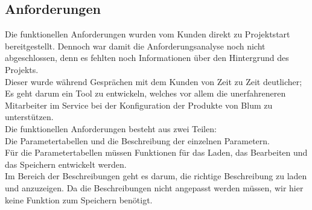 \documentclass[a4paper,12pt,top=2.5cm,bottom=2.5cm, left=2.5cm, right=2.5cm, numbers=noenddot]{scrartcl}
\begin{document}
\subsection{Anforderungen}
Die funktionellen Anforderungen wurden vom Kunden direkt zu Projektstart bereitgestellt. Dennoch war damit die Anforderungsanalyse noch nicht abgeschlossen, denn es fehlten noch Informationen über den Hintergrund des Projekts. \\
Dieser wurde während Gesprächen mit dem Kunden von Zeit zu Zeit deutlicher; Es geht darum ein Tool zu entwickeln, welches vor allem die unerfahreneren Mitarbeiter im Service bei der Konfiguration der Produkte von Blum zu unterstützen.\\
Die funktionellen Anforderungen besteht aus zwei Teilen: \\
Die Parametertabellen und die Beschreibung der einzelnen Parametern.\\
Für die Parametertabellen müssen Funktionen für das Laden, das Bearbeiten und das Speichern entwickelt werden.\\
Im Bereich der Beschreibungen geht es darum, die richtige Beschreibung zu laden und anzuzeigen. Da die Beschreibungen nicht angepasst werden müssen, wir hier keine Funktion zum Speichern benötigt.
\end{document}

